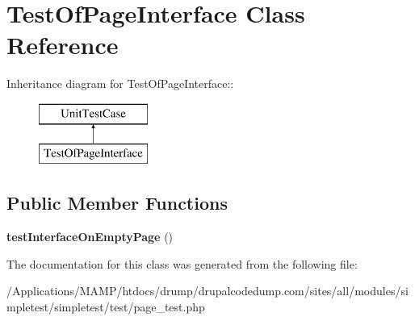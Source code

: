 \hypertarget{class_test_of_page_interface}{
\section{TestOfPageInterface Class Reference}
\label{class_test_of_page_interface}
}
Inheritance diagram for TestOfPageInterface::\begin{figure}[H]
\begin{center}
\leavevmode
\includegraphics[height=2cm]{class_test_of_page_interface}
\end{center}
\end{figure}
\subsection*{Public Member Functions}
\begin{DoxyCompactItemize}
\item 
\hypertarget{class_test_of_page_interface_a338bf8d5c0b3259a023e92951416ebaa}{
{\bfseries testInterfaceOnEmptyPage} ()}
\label{class_test_of_page_interface_a338bf8d5c0b3259a023e92951416ebaa}

\end{DoxyCompactItemize}


The documentation for this class was generated from the following file:\begin{DoxyCompactItemize}
\item 
/Applications/MAMP/htdocs/drump/drupalcodedump.com/sites/all/modules/simpletest/simpletest/test/page\_\-test.php\end{DoxyCompactItemize}
